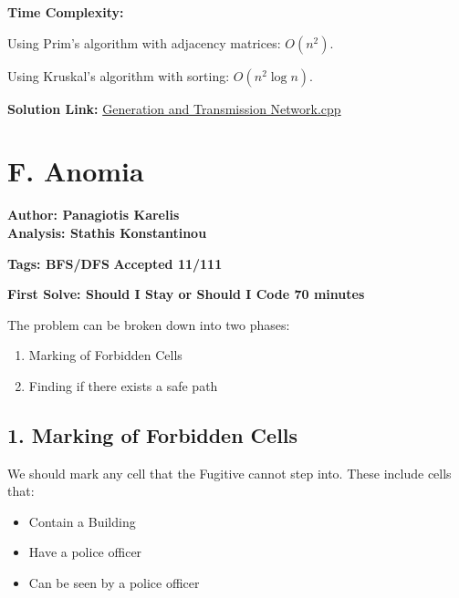 \documentclass{article}
\begin{document}
\vspace{1em}

\noindent \noindent \textbf{Time Complexity:}

\noindent Using Prim’s algorithm with adjacency matrices: $O(n^2)$. 

\noindent Using Kruskal’s algorithm with sorting: $O(n^2 \log n)$.

\vspace{1em}
\noindent \textbf{Solution Link:} 
\href{https://github.com/StathisKons/GRCPC-2024-Editorial-Implementations/blob/main/Sample%20Implementations/E.%20Generation%20and%20Transmission%20Network.cpp}{Generation and Transmission Network.cpp}

\newpage
\vspace{5em}

\section*{F. Anomia}

    \textbf{Author: Panagiotis Karelis}\\
    \textbf{Analysis: Stathis Konstantinou}
    
    \vspace{2em}
    \noindent \textbf{Tags: BFS/DFS} 
    \hfill \textbf{Accepted 11/111}
    
    \hfill \textbf{First Solve: Should I Stay or Should I Code 70 minutes}
    
    \vspace{2em}
    
    \noindent The problem can be broken down into two phases:
    
    \begin{enumerate}
        \item{Marking of Forbidden Cells}
        \item{Finding if there exists a safe path}
    \end{enumerate}
    
    \subsection*{1. Marking of Forbidden Cells}

        \noindent We should mark any cell that the Fugitive cannot step into. These include cells that:
        \begin{itemize}
            \item{Contain a Building}
            \item{Have a police officer}
            \item{Can be seen by a police officer}
        \end{itemize}
\end{document}
